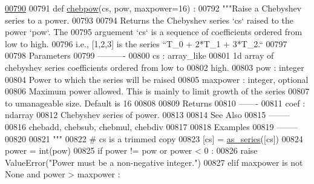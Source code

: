\begin{DoxyCode}
\hypertarget{namespacepyneb_1_1utils_1_1chebyshev_l00790}{}\hyperlink{namespacepyneb_1_1utils_1_1chebyshev_ab647ff3aa7750a09b934b98cddd4c90d}{00790} 
00791 \textcolor{keyword}{def }\hyperlink{namespacepyneb_1_1utils_1_1chebyshev_ab647ff3aa7750a09b934b98cddd4c90d}{chebpow}(cs, pow, maxpower=16) :
00792     \textcolor{stringliteral}{"""Raise a Chebyshev series to a power.}
00793 \textcolor{stringliteral}{}
00794 \textcolor{stringliteral}{    Returns the Chebyshev series `cs` raised to the power `pow`. The}
00795 \textcolor{stringliteral}{    arguement `cs` is a sequence of coefficients ordered from low to high.}
00796 \textcolor{stringliteral}{    i.e., [1,2,3] is the series  ``T\_0 + 2*T\_1 + 3*T\_2.``}
00797 \textcolor{stringliteral}{}
00798 \textcolor{stringliteral}{    Parameters}
00799 \textcolor{stringliteral}{    ----------}
00800 \textcolor{stringliteral}{    cs : array\_like}
00801 \textcolor{stringliteral}{        1d array of chebyshev series coefficients ordered from low to}
00802 \textcolor{stringliteral}{        high.}
00803 \textcolor{stringliteral}{    pow : integer}
00804 \textcolor{stringliteral}{        Power to which the series will be raised}
00805 \textcolor{stringliteral}{    maxpower : integer, optional}
00806 \textcolor{stringliteral}{        Maximum power allowed. This is mainly to limit growth of the series}
00807 \textcolor{stringliteral}{        to umanageable size. Default is 16}
00808 \textcolor{stringliteral}{}
00809 \textcolor{stringliteral}{    Returns}
00810 \textcolor{stringliteral}{    -------}
00811 \textcolor{stringliteral}{    coef : ndarray}
00812 \textcolor{stringliteral}{        Chebyshev series of power.}
00813 \textcolor{stringliteral}{}
00814 \textcolor{stringliteral}{    See Also}
00815 \textcolor{stringliteral}{    --------}
00816 \textcolor{stringliteral}{    chebadd, chebsub, chebmul, chebdiv}
00817 \textcolor{stringliteral}{}
00818 \textcolor{stringliteral}{    Examples}
00819 \textcolor{stringliteral}{    --------}
00820 \textcolor{stringliteral}{}
00821 \textcolor{stringliteral}{    """}
00822     \textcolor{comment}{# cs is a trimmed copy}
00823     [cs] = \hyperlink{namespacepyneb_1_1utils_1_1polyutils_a9c3751d438f0f75922155c7823fe2699}{as\_series}([cs])
00824     power = int(pow)
00825     \textcolor{keywordflow}{if} power != pow \textcolor{keywordflow}{or} power < 0 :
00826         \textcolor{keywordflow}{raise} ValueError(\textcolor{stringliteral}{"Power must be a non-negative integer."})
00827     \textcolor{keywordflow}{elif} maxpower \textcolor{keywordflow}{is} \textcolor{keywordflow}{not} \textcolor{keywordtype}{None} \textcolor{keywordflow}{and} power > maxpower :

\end{DoxyCode}
